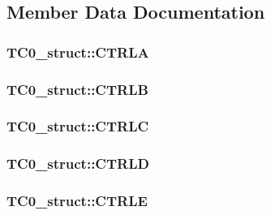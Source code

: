 \subsection{Member Data Documentation}
\hypertarget{struct_t_c0__struct_a1bf3677e6cc34a522c2e012735a53c7c}{
\subsubsection[{CTRLA}]{ {\bf TC0\_\-struct::CTRLA}}}
\label{struct_t_c0__struct_a1bf3677e6cc34a522c2e012735a53c7c}
\hypertarget{struct_t_c0__struct_a626418bef0712363e24ef5114957bd6d}{
\subsubsection[{CTRLB}]{ {\bf TC0\_\-struct::CTRLB}}}
\label{struct_t_c0__struct_a626418bef0712363e24ef5114957bd6d}
\hypertarget{struct_t_c0__struct_ae59db05c28b19d856ea3c7273a70083d}{
\subsubsection[{CTRLC}]{ {\bf TC0\_\-struct::CTRLC}}}
\label{struct_t_c0__struct_ae59db05c28b19d856ea3c7273a70083d}
\hypertarget{struct_t_c0__struct_a143337bdb5b8259aa230ec89685a71d7}{
\subsubsection[{CTRLD}]{ {\bf TC0\_\-struct::CTRLD}}}
\label{struct_t_c0__struct_a143337bdb5b8259aa230ec89685a71d7}
\hypertarget{struct_t_c0__struct_ab2252e6a7f24cc8510c2dde8e2a43ef1}{
\subsubsection[{CTRLE}]{ {\bf TC0\_\-struct::CTRLE}}}

